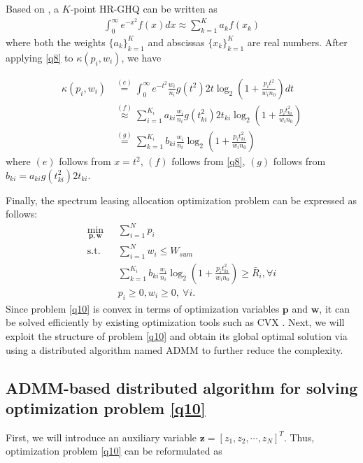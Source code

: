 \documentclass[journal]{IEEEtran}
\begin{document}
Based on \cite{NMSteen}, a $K$-point HR-GHQ can be written as
\begin{align} \label{q8}
\int_{0}^{\infty}e^{-x^2} f\left(x\right) dx \approx \sum\limits_{k = 1}^{K} a_k f\left(x_k\right)
\end{align}
where both the weights $\{a_k\}_{k = 1}^K$ and abscissas $\{x_k\}_{k = 1}^K$ are real numbers. After applying \eqref{q8} to $\kappa \left(p_i, w_i\right)$, we have

\begin{align} \label{q9}
\kappa \left(p_i, w_i\right) &\overset{\left(e\right)}{=} \int_{0}^{\infty}e^{-t^2}\frac{w_i}{n_i} g\left(t^2\right) 2t \log_2\left(1 + \frac{p_it^2}{w_in_0}\right)dt  \nonumber \\
& \overset{\left(f\right)}{\approx} \sum\limits_{i = 1}^{K_i}a_{ki}\frac{w_i}{n_i}g\left(t_{ki}^2\right)2t_{ki}\log_2\left(1 + \frac{p_it_{ki}^2}{w_in_0}\right) \nonumber \\
& \overset{\left(g\right)}{=} \sum\limits_{k = 1}^{K_i}b_{ki}\frac{w_i}{n_i}\log_2\left(1 + \frac{p_it_{ki}^2}{w_in_0}\right)
\end{align}
where $\left(e\right)$ follows from $x = t^2$, $\left(f\right)$ follows from \eqref{q8}, $\left(g\right)$ follows from $b_{ki} = a_{ki}g\left(t_{ki}^2\right)2t_{ki}$.

Finally, the spectrum leasing allocation optimization problem can be expressed as follows:
\begin{subequations}\label{q10}
	\begin{align}
	\min_{\mathbf{p}, \mathbf{w}}\ & \sum\limits_{i = 1}^{N} p_i \label{q10a} \\ \mbox{s.t.} \quad &  \sum\limits_{i = 1}^{N} w_i \leq W_{sum} \label{q10b} \\ \quad &  \sum\limits_{k = 1}^{K_i}b_{ki}\frac{w_i}{n_i}\log_2\left(1 + \frac{p_it_{ki}^2}{w_in_0}\right) \geq \bar{R}_i, \forall i \label{q10c}\\
	& p_i \geq 0, w_i \geq 0, \ \forall i. \label{q10d}
	\end{align}
\end{subequations}
Since problem \eqref{q10} is convex in terms of optimization variables $\mathbf{p}$ and $\mathbf{w}$, it can be solved efficiently by existing optimization tools such as CVX \cite{SBoyd1}. Next, we will exploit the structure of problem \eqref{q10} and obtain its global optimal solution via using a distributed algorithm named ADMM \cite{SBoyd2,EChen} to further reduce the complexity.
\subsection{ADMM-based distributed algorithm for solving optimization problem \eqref{q10}}
First, we will introduce an auxiliary variable $\mathbf{z} = \left[z_1, z_2, \cdots, z_N\right]^T$. Thus, optimization problem \eqref{q10} can be reformulated as
\end{document}
